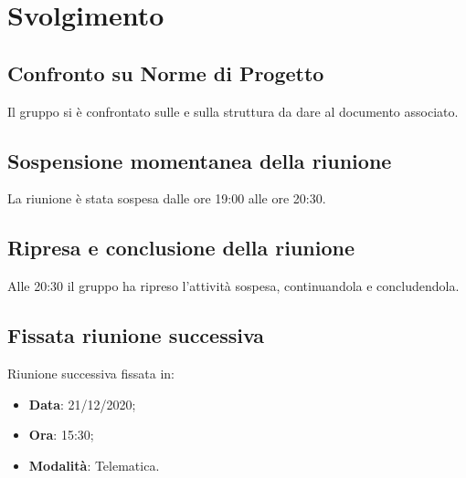 \documentclass[]{article}
\begin{document}
	\newpage

	\section{Svolgimento}
		\subsection{Confronto su Norme di Progetto}
		Il gruppo si è confrontato sulle  e sulla struttura da dare al documento associato.

		\subsection{Sospensione momentanea della riunione}
		La riunione è stata sospesa dalle ore 19:00 alle ore 20:30.
		
		\subsection{Ripresa e conclusione della riunione}
		Alle 20:30 il gruppo ha ripreso l'attività sospesa, continuandola e concludendola.

		\subsection{Fissata riunione successiva}
		Riunione successiva fissata in:
		\begin{itemize}
			\item \textbf{Data}: 21/12/2020;
			\item \textbf{Ora}: 15:30;
			\item \textbf{Modalità}: Telematica.
		\end{itemize}

	
\end{document}
